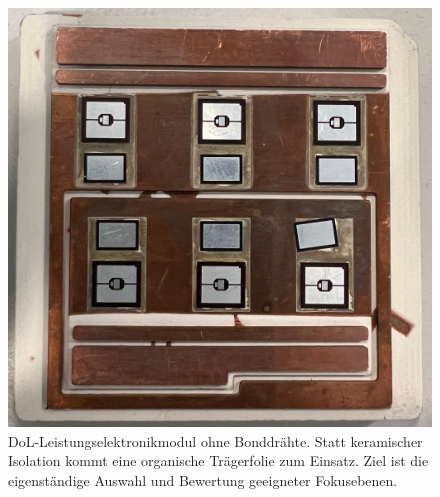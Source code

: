 \begin{figure}[htbp]
    \centering
    \includegraphics[scale=0.13]{Bilder/probe3}
    \caption{DoL-Leistungselektronikmodul ohne Bonddrähte. Statt keramischer Isolation kommt eine organische Trägerfolie zum Einsatz. Ziel ist die eigenständige Auswahl und Bewertung geeigneter Fokusebenen.}
    \vspace{0.2cm}
    \label{Abb.5: DoL-Leistungselektronikmodul ohne Bonddrähte. Statt keramischer Isolation kommt eine organische Trägerfolie zum Einsatz. Ziel ist die eigenständige Auswahl und Bewertung geeigneter Fokusebenen. }
\end{figure} 
\vspace{0.2cm}